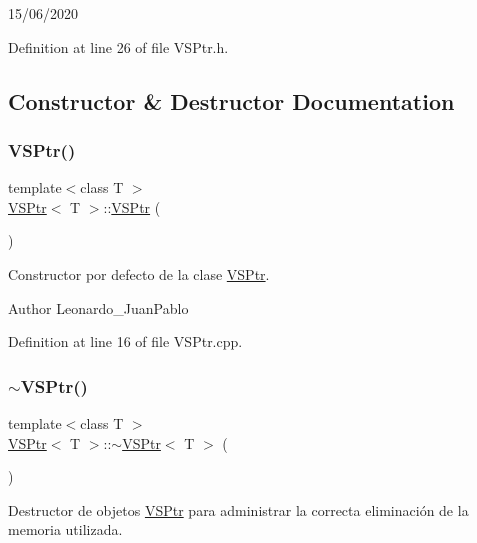 15/06/2020 

Definition at line 26 of file V\+S\+Ptr.\+h.



\subsection{Constructor \& Destructor Documentation}
\mbox{\label{class_v_s_ptr_a3f9256a7afba8e671e188c87103b4570}} 
\subsubsection{\texorpdfstring{V\+S\+Ptr()}{VSPtr()}}
{\footnotesize\ttfamily template$<$class T $>$ \\
\hyperlink{class_v_s_ptr}{V\+S\+Ptr}$<$ T $>$\+::\hyperlink{class_v_s_ptr}{V\+S\+Ptr} (\begin{DoxyParamCaption}{ }\end{DoxyParamCaption})}



Constructor por defecto de la clase \hyperlink{class_v_s_ptr}{V\+S\+Ptr}. 

\begin{DoxyAuthor}{Author}
Leonardo\+\_\+\+Juan\+Pablo 
\end{DoxyAuthor}


Definition at line 16 of file V\+S\+Ptr.\+cpp.

\mbox{\label{class_v_s_ptr_a3868ebe6b47b27b0e1397a75407d08f8}} 
\subsubsection{\texorpdfstring{$\sim$\+V\+S\+Ptr()}{~VSPtr()}}
{\footnotesize\ttfamily template$<$class T $>$ \\
\hyperlink{class_v_s_ptr}{V\+S\+Ptr}$<$ T $>$\+::$\sim$\hyperlink{class_v_s_ptr}{V\+S\+Ptr}$<$ T $>$ (\begin{DoxyParamCaption}{ }\end{DoxyParamCaption})}



Destructor de objetos \hyperlink{class_v_s_ptr}{V\+S\+Ptr} para administrar la correcta eliminación de la memoria utilizada. 

